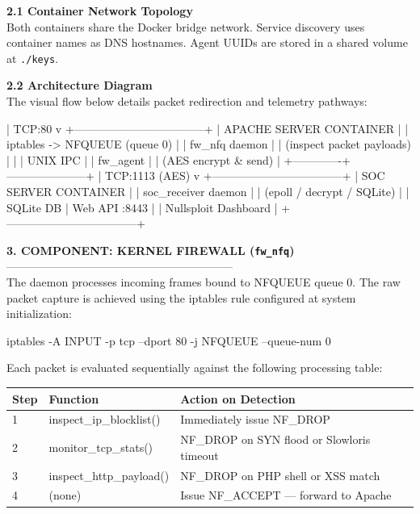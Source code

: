 \documentclass[12pt,a4paper]{article}
\newcommand{\thfmt}[1]{\textbf{#1}}
\begin{document}
\textbf{2.1 Container Network Topology}\\
Both containers share the Docker bridge network. Service discovery uses container names as DNS hostnames. Agent UUIDs are stored in a shared volume at \texttt{./keys}.

\newpage
\textbf{2.2 Architecture Diagram}\\
The visual flow below details packet redirection and telemetry pathways:

\begin{codeblock}
          |  TCP:80
          v
  +-----------------------------------+
  |     APACHE SERVER CONTAINER       |
  |  iptables -> NFQUEUE (queue 0)    |
  |        fw_nfq daemon              |
  |     (inspect packet payloads)     |
  |              |  UNIX IPC          |
  |          fw_agent                 |
  |      (AES encrypt & send)         |
  +-------------+---------------------+
                |   TCP:1113  (AES)
                v
  +-----------------------------------+
  |      SOC SERVER CONTAINER         |
  |       soc_receiver daemon         |
  |   (epoll / decrypt / SQLite)      |
  |   SQLite DB  |  Web API :8443     |
  |         Nullsploit Dashboard      |
  +-----------------------------------+
\end{codeblock}

\vspace{1.5em}
\textbf{3. COMPONENT: KERNEL FIREWALL (\texttt{fw\_nfq})}\\
------------------------------------------------------------\\
The daemon processes incoming frames bound to NFQUEUE queue 0. The raw packet capture is achieved using the iptables rule configured at system initialization:

\begin{codeblock}
iptables -A INPUT -p tcp --dport 80 -j NFQUEUE --queue-num 0
\end{codeblock}

Each packet is evaluated sequentially against the following processing table:

\begin{center}
\begin{tabular}{C{1.2cm} L{5.2cm} L{8.1cm}}
\hline
\thfmt{Step} & \thfmt{Function} & \thfmt{Action on Detection} \\
 & inspect\_\allowbreak ip\_\allowbreak blocklist() & Immediately issue NF\_DROP \\
2 & monitor\_\allowbreak tcp\_\allowbreak stats()    & NF\_DROP on SYN flood or Slowloris timeout \\
3 & inspect\_\allowbreak http\_\allowbreak payload() & NF\_DROP on PHP shell or XSS match \\
4 & (none)                   & Issue NF\_ACCEPT --- forward to Apache \\
\hline
\end{tabular}
\end{center}
\end{document}
